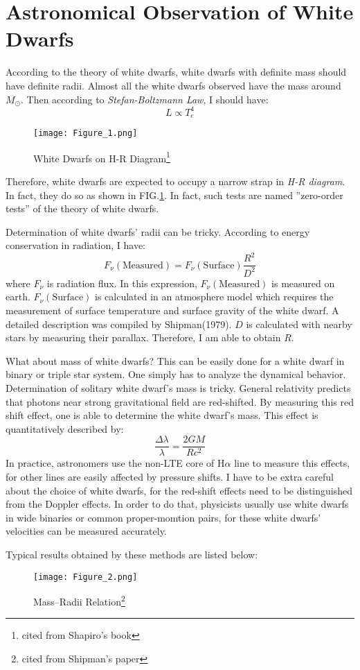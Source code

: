 \documentclass[reprint]{revtex4-1}
\begin{document}
\section{Astronomical Observation of White Dwarfs}
 According to the theory of white dwarfs, white dwarfs with definite mass should have definite radii. Almost all the white dwarfs observed have the mass around $M_{\odot}$. Then according to \emph{Stefan-Boltzmann Law}, I should have:
 \begin{equation}
 L\propto T_e^4
 \end{equation} 
 \begin{figure}
 	\centering   
 	\texttt{[image: Figure\_1.png]}  
 	\caption{White Dwarfs on H-R Diagram\footnote{cited from Shapiro's book}} 
 	\label{fig:1} 
 \end{figure}
 Therefore, white dwarfs are expected to occupy a narrow strap in \emph{H-R diagram}. In fact, they do so as shown in FIG.\ref{fig:1}. In fact, such tests are named ''zero-order tests'' of the theory of white dwarfs.\par
 Determination of white dwarfs' radii can be tricky. According to energy conservation in radiation, I have:
 \begin{equation}
 F_{\nu}(\text{Measured})=F_{\nu}(\text{Surface})\frac{R^{2}}{D^{2}}
 \end{equation}
 where $F_{\nu}$ is radiation flux. In this expression, $F_{\nu}(\text{Measured})$ is measured on earth. $F_{\nu}(\text{Surface})$ is calculated in an atmosphere model which requires the measurement of surface temperature and surface gravity of the white dwarf. A detailed description was compiled by Shipman(1979). $D$ is calculated with nearby stars by measuring their parallax. Therefore, I am able to obtain $R$.\par
 What about mass of white dwarfs? This can be easily done for a white dwarf in binary or triple star system. One simply has to analyze the dynamical behavior. Determination of solitary white dwarf's mass is tricky. General relativity predicts that photons near strong gravitational field are red-shifted. By measuring this red shift effect, one is able to determine the white dwarf's mass. This effect is quantitatively described by:
 \begin{equation}
 \frac{\Delta \lambda}{\lambda}=\frac{2GM}{Rc^2}
 \end{equation}
 In practice, astronomers use the non-LTE core of H$\alpha$ line to measure this effects, for other lines are easily affected by pressure shifts. I have to be extra careful about the choice of white dwarfs, for the red-shift effects need to be distinguished from the Doppler effects. In order to do that, physicists usually use white dwarfs in wide binaries or common proper-momtion pairs, for these white dwarfs' velocities can be measured accurately.\par
 Typical results obtained by these methods are listed below:
  \begin{figure}
  	\centering   
  	\texttt{[image: Figure\_2.png]}  
  	\caption{Mass--Radii Relation\footnote{cited from Shipman's paper}} 
  	\label{fig:2} 
  \end{figure}
  
\end{document}
